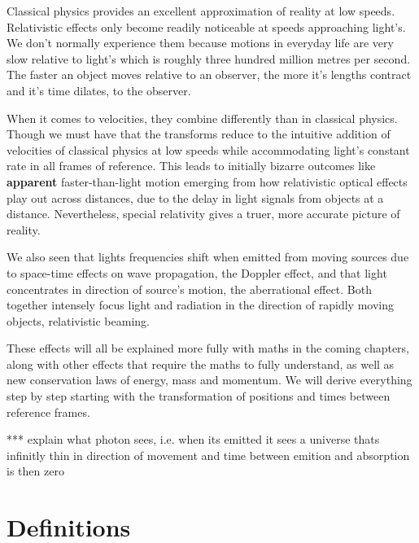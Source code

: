 Classical physics provides an excellent approximation of reality at low speeds. Relativistic effects only become readily noticeable at speeds approaching light's. We don't normally experience them because motions in everyday life are very slow relative to light's which is roughly three hundred million metres per second. The faster an object moves relative to an observer, the more it's lengths contract and it's time dilates, to the observer.

When it comes to velocities, they combine differently than in classical physics. Though we must have that the transforms reduce to the intuitive addition of velocities of classical physics at low speeds while accommodating light's constant rate in all frames of reference. This leads to initially bizarre outcomes like \textbf{apparent} faster-than-light motion emerging from how relativistic optical effects play out across distances, due to the delay in light signals from objects at a distance. Nevertheless, special relativity gives a truer, more accurate picture of reality.

We also seen that lights frequencies shift when emitted from moving sources due to space-time effects on wave propagation, the Doppler effect, and that light concentrates in direction of source's motion, the aberrational effect. Both together intensely focus light and radiation in the direction of rapidly moving objects, relativistic beaming.

These effects will all be explained more fully with maths in the coming chapters, along with other effects that require the maths to fully understand, as well as new conservation laws of energy, mass and momentum. We will derive everything step by step starting with the transformation of positions and times between reference frames.

*** explain what photon sees, i.e. when its emitted it sees a universe thats infinitly thin in direction of movement and time between emition and absorption is then zero

\section{Definitions}


